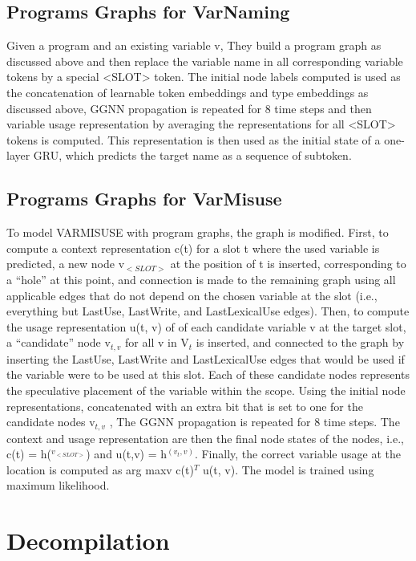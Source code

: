 \documentclass{article}
\begin{document}
\subsection{Programs Graphs for VarNaming}
Given a program and an existing variable v, They build a program graph as discussed above and then replace the variable name in all corresponding variable tokens by a special <SLOT> token. The initial node labels computed is used as the concatenation of learnable token embeddings and type embeddings as discussed above, GGNN propagation is repeated for 8 time steps and then variable usage representation by averaging the representations for all <SLOT> tokens is computed. This representation is then used as the initial state of a one-layer GRU, which predicts the target name as a sequence of subtoken.

\subsection{Programs Graphs for VarMisuse}
To model VARMISUSE with program graphs, the graph is modified. First, to compute a context representation c(t) for a slot t where the used variable is predicted, a new node v$_{<SLOT>}$ at the position of t is inserted, corresponding to a “hole” at this point, and connection is made to the remaining graph using all applicable edges that do not depend on the chosen variable at the slot (i.e., everything but LastUse, LastWrite, and LastLexicalUse edges). Then, to compute the usage representation u(t, v) of of each candidate variable v at the target slot, a “candidate” node v$_{t,v}$ for all v in V$_t$ is inserted, and connected to the graph by inserting the LastUse, LastWrite and LastLexicalUse edges that would be used if the variable were to be used at this slot. Each of these candidate nodes represents the speculative placement of the variable within the scope.
Using the initial node representations, concatenated with an extra bit that is set to one for the candidate nodes v$_{t,v}$ , The GGNN propagation is repeated for 8 time steps. The context and usage representation are then the final node states of the nodes, i.e., c(t) = h($^{v_{<SLOT>}}$) and u(t,v) = h$^{(v_t,v)}$. Finally, the correct variable usage at the location is computed as arg maxv c(t)$^T$ u(t, v). The model is trained using maximum likelihood.

\section{Decompilation}
\label{decompilation}
\end{document}
